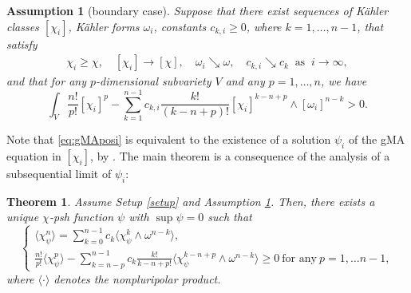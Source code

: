 \documentclass[10pt,a4paper]{amsart}
\numberwithin{equation}{section}
\newtheorem{thm}[equation]{Theorem}
\newtheorem{asmp}[equation]{Assumption}
\begin{document}
\begin{asmp}[boundary case]\label{asmp:bdryMA}
    Suppose that there exist sequences of Kähler classes $[\chi_i]$, Kähler forms $\omega_i$, constants $c_{k,i}\ge0$, where $k=1,\dots, n-1$, that satisfy 
        \begin{align}\label{eq:boundary}
            \chi_i\ge\chi , \quad [\chi_i]\to[\chi],\quad \omega_i\searrow \omega,\quad c_{k,i}\searrow c_k\ \text{ as }\ i\to\infty,
        \end{align}
    and that for any $p$-dimensional subvariety $V$ and any $p=1,\dots, n$, we have
        \begin{equation}\label{eq:gMAposi}
            \int_V\frac{n!}{p!}[\chi_i]^p-\sum_{k=1}^{n-1}c_{k,i}\frac{k!}{(k-n+p)!}[\chi_i]^{k-n+p}\wedge[\omega_i]^{n-k}>0.
        \end{equation}
\end{asmp}

Note that \eqref{eq:gMAposi} is equivalent to the existence of a solution $\psi_i$ of the gMA equation in $[\chi_i]$, by \cite{Datar-Pingali,FM}. The main theorem is a consequence of the analysis of a subsequential limit of $\psi_i$:

\begin{thm}\label{thm:main}
    Assume Setup \ref{setup} and Assumption \ref{asmp:bdryMA}.
    Then, there exists a unique $\chi$-psh function $\psi$ with $\sup \psi=0$ such that
    \begin{equation}\label{eq:gMA}
    \begin{cases}
        \langle\chi_\psi^n\rangle=\sum_{k=0}^{n-1}c_k\langle\chi_\psi^k\wedge\omega^{n-k}\rangle,
        \\
        \frac{n!}{p!}\langle\chi_\psi^p\rangle-\sum_{k=n-p}^{n-1}c_k\frac{k!}{k-n+p!}\langle\chi_\psi^{k-n+p}\wedge\omega^{n-k}\rangle\ge0 \ \text{for any} \ p=1,\dots n-1, 
    \end{cases}
    \end{equation}
    where $\langle\cdot\rangle$ denotes the nonpluripolar product. 
\end{thm}
\end{document}
